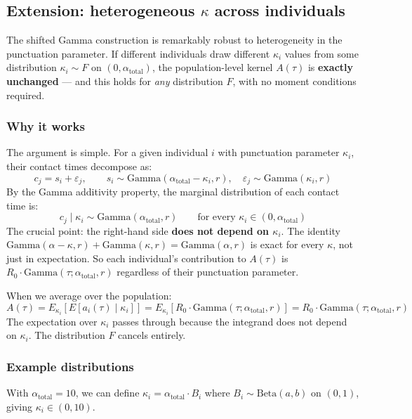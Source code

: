 \documentclass[11pt]{article}
\begin{document}
\subsection{Extension: heterogeneous $\kappa$ across individuals}

The shifted Gamma construction is remarkably robust to heterogeneity in the punctuation parameter. If different individuals draw different $\kappa_i$ values from some distribution $\kappa_i \sim F$ on $(0, \alpha_{\text{total}})$, the population-level kernel $A(\tau)$ is \textbf{exactly unchanged} --- and this holds for \textit{any} distribution $F$, with no moment conditions required.

\subsubsection{Why it works}

The argument is simple. For a given individual $i$ with punctuation parameter $\kappa_i$, their contact times decompose as:
\[
c_j = s_i + \varepsilon_j, \qquad s_i \sim \text{Gamma}(\alpha_{\text{total}} - \kappa_i, r), \quad \varepsilon_j \sim \text{Gamma}(\kappa_i, r)
\]
By the Gamma additivity property, the marginal distribution of each contact time is:
\[
c_j \mid \kappa_i \sim \text{Gamma}(\alpha_{\text{total}}, r) \qquad \text{for every } \kappa_i \in (0, \alpha_{\text{total}})
\]
The crucial point: the right-hand side \textbf{does not depend on $\kappa_i$}. The identity $\text{Gamma}(\alpha - \kappa, r) + \text{Gamma}(\kappa, r) = \text{Gamma}(\alpha, r)$ is exact for every $\kappa$, not just in expectation. So each individual's contribution to $A(\tau)$ is $R_0 \cdot \text{Gamma}(\tau; \alpha_{\text{total}}, r)$ regardless of their punctuation parameter.

When we average over the population:
\[
A(\tau) = E_{\kappa_i}\left[E[a_i(\tau) \mid \kappa_i]\right] = E_{\kappa_i}\left[R_0 \cdot \text{Gamma}(\tau; \alpha_{\text{total}}, r)\right] = R_0 \cdot \text{Gamma}(\tau; \alpha_{\text{total}}, r)
\]
The expectation over $\kappa_i$ passes through because the integrand does not depend on $\kappa_i$. The distribution $F$ cancels entirely.

\subsubsection{Example distributions}

With $\alpha_{\text{total}} = 10$, we can define $\kappa_i = \alpha_{\text{total}} \cdot B_i$ where $B_i \sim \text{Beta}(a, b)$ on $(0, 1)$, giving $\kappa_i \in (0, 10)$.
\end{document}
